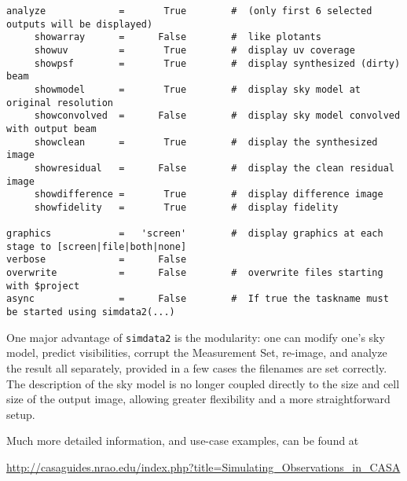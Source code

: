 \begin{verbatim}
analyze             =       True        #  (only first 6 selected outputs will be displayed)
     showarray      =      False        #  like plotants
     showuv         =       True        #  display uv coverage
     showpsf        =       True        #  display synthesized (dirty) beam
     showmodel      =       True        #  display sky model at original resolution
     showconvolved  =      False        #  display sky model convolved with output beam
     showclean      =       True        #  display the synthesized image
     showresidual   =      False        #  display the clean residual image
     showdifference =       True        #  display difference image
     showfidelity   =       True        #  display fidelity

graphics            =   'screen'        #  display graphics at each stage to [screen|file|both|none]
verbose             =      False        
overwrite           =      False        #  overwrite files starting with $project
async               =      False        #  If true the taskname must be started using simdata2(...)
\end{verbatim}
\normalsize

One major advantage of {\tt simdata2} is the modularity: one can
modify one's sky model, predict visibilities, corrupt the Measurement
Set, re-image, and analyze the result all separately, provided in a
few cases the filenames are set correctly.  The description of the sky
model is no longer coupled directly to the size and cell size of the
output image, allowing greater flexibility and a more straightforward setup.

Much more detailed information, and use-case examples, can be found at 

\url{http://casaguides.nrao.edu/index.php?title=Simulating_Observations_in_CASA}


